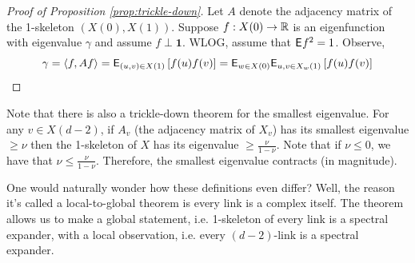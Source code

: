 \begin{proof}[Proof of Proposition \ref{prop:trickle-down}]
    Let \(A\) denote the adjacency matrix of the 1-skeleton \((X(0), X(1))\). 
    Suppose \(f: X(0) \to \R\) is an eigenfunction with eigenvalue \(\gamma\)
    and assume \(f \perp \bm{1}\). WLOG, assume that \(\Ewb{f^2} = 1\). Observe, 
    \begin{equation}
        \gamma = \langle f, Af \rangle = \E[(u, v) \in X(1)]{f(u)f(v)} = 
        \Ewb[w \in X(0)]{\E[u, v \in X_w(1)]{f(u)f(v)}}
    \end{equation}
\end{proof}


\begin{remark}
    Note that there is also a trickle-down theorem for the smallest eigenvalue. For any \(v \in X(d-2)\), if 
    \(A_v\) (the adjacency matrix of \(X_v\)) has its smallest eigenvalue \(\geq \nu\) then 
    the 1-skeleton of \(X\) has its eigenvalue \(\geq \frac{\nu}{1 - \nu}\). Note that 
    if \(\nu \leq 0\), we have that \(\nu \leq \frac{\nu}{1 - \nu}\). Therefore, the smallest eigenvalue contracts (in magnitude).
\end{remark}

\begin{remark}
    One would naturally wonder how these definitions even differ? Well, the reason it's called a 
    local-to-global theorem is every link is a complex itself. The theorem allows us to make a 
    global statement, i.e. 1-skeleton of every link is a spectral expander, with a local observation, i.e. every \((d-2)\)-link is a spectral expander.
\end{remark}

